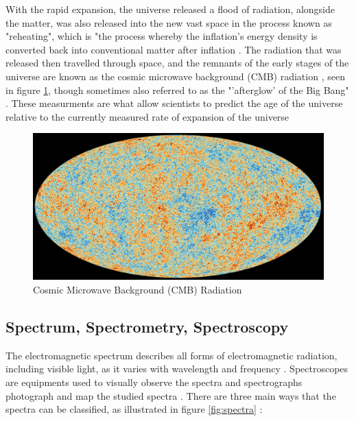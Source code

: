 \documentclass[12pt]{article}
\begin{document}
With the rapid expansion, the universe released a flood of radiation, alongside the matter, was also released into the new vast space
\cite{britbigbang,spacebigbang}
in the process known as "reheating", which is "the process whereby the inflation's energy density is converted back
into conventional matter after inflation
\cite{reheating}.
The radiation that was released then travelled through space, and the remnants of the early stages of the universe are known
as the cosmic microwave background (CMB) radiation \cite{britbigbang}, seen in figure \ref{fig:cmb}, 
though sometimes also referred to as the "'afterglow' of the Big Bang"
\cite{spacebigbang}.
These measurments are what allow scientists to predict the age of the universe relative to the currently measured rate of expansion of the universe
\cite{hubblebigbang}

\begin{figure} [H]
    \centering
    \includegraphics[width=12.5cm]{cmb.jpg}
    \caption{\centering \footnotesize{Cosmic Microwave Background (CMB) Radiation \protect\cite{cmbpic}}}
    \label{fig:cmb}
\end{figure}

\subsection{Spectrum, Spectrometry, Spectroscopy} \label{sec:1.2}

The electromagnetic spectrum describes all forms of electromagnetic radiation, including visible light, as it varies with wavelength
and frequency  
\cite{britspectra,hubblespectra}.
Spectroscopes are equipments used to visually observe the spectra and spectrographs photograph and map the studied spectra
\cite{britspectra}.
There are three main ways that the spectra can be classified, as illustrated in figure \ref{fig:spectra} \cite{spectrapic}:
\end{document}
